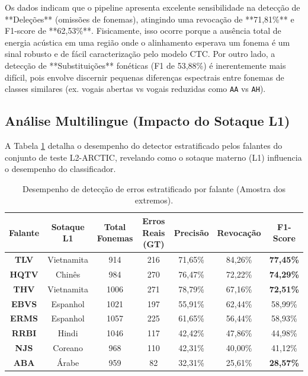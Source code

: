 \documentclass[12pt]{article}
\begin{document}
Os dados indicam que o pipeline apresenta excelente sensibilidade na detecção de **Deleções** (omissões de fonemas), atingindo uma revocação de **71,81\%** e F1-score de **62,53\%**. Fisicamente, isso ocorre porque a ausência total de energia acústica em uma região onde o alinhamento esperava um fonema é um sinal robusto e de fácil caracterização pelo modelo CTC. Por outro lado, a detecção de **Substituições** fonéticas (F1 de 53,88\%) é inerentemente mais difícil, pois envolve discernir pequenas diferenças espectrais entre fonemas de classes similares (ex. vogais abertas vs vogais reduzidas como \texttt{AA} vs \texttt{AH}).

\subsection{Análise Multilingue (Impacto do Sotaque L1)}
A Tabela \ref{tab:sotaques} detalha o desempenho do detector estratificado pelos falantes do conjunto de teste L2-ARCTIC, revelando como o sotaque materno (L1) influencia o desempenho do classificador.

\begin{table}[ht]
\centering
\caption{Desempenho de detecção de erros estratificado por falante (Amostra dos extremos).}
\label{tab:sotaques}
\begin{tabular}{ccccccc}
\toprule
\textbf{Falante} & \textbf{Sotaque L1} & \textbf{Total Fonemas} & \textbf{Erros Reais (GT)} & \textbf{Precisão} & \textbf{Revocação} & \textbf{F1-Score} \\
\midrule
\textbf{TLV} & Vietnamita & 914 & 216 & 71,65\% & 84,26\% & \textbf{77,45\%} \\
\textbf{HQTV} & Chinês & 984 & 270 & 76,47\% & 72,22\% & \textbf{74,29\%} \\
\textbf{THV} & Vietnamita & 1006 & 271 & 78,79\% & 67,16\% & \textbf{72,51\%} \\
\textbf{EBVS} & Espanhol & 1021 & 197 & 55,91\% & 62,44\% & 58,99\% \\
\textbf{ERMS} & Espanhol & 1057 & 225 & 61,65\% & 56,44\% & 58,93\% \\
\textbf{RRBI} & Hindi & 1046 & 117 & 42,42\% & 47,86\% & 44,98\% \\
\textbf{NJS} & Coreano & 968 & 110 & 42,31\% & 40,00\% & 41,12\% \\
\textbf{ABA} & Árabe & 959 & 82 & 32,31\% & 25,61\% & \textbf{28,57\%} \\
\bottomrule
\end{tabular}
\end{table}
\end{document}
